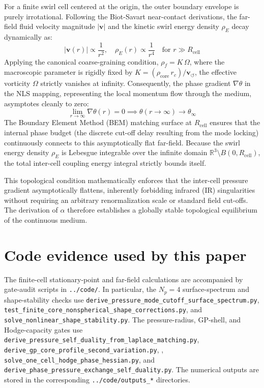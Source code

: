 \documentclass[11pt]{article}
\begin{document}
        For a finite swirl cell centered at the origin, the outer boundary envelope is purely irrotational. Following the Biot-Savart near-contact derivations, the far-field fluid velocity magnitude $|\mathbf{v}|$ and the kinetic swirl energy density $\rho_{\!E}$ decay dynamically as:
        \begin{equation}
            |\mathbf{v}(r)| \propto \frac{1}{r^2}, \quad \rho_{\!E}(r) \propto \frac{1}{r^4} \quad \text{for } r \gg R_{\text{cell}}
        \end{equation}
        Applying the canonical coarse-graining condition, $\rho_{\!f} = K\,\Omega$, where the macroscopic parameter is rigidly fixed by $K = (\rho_{\text{core}}\,r_c)/\mathbf{v}_{\!\boldsymbol{\circlearrowleft}}$, the effective vorticity $\Omega$ strictly vanishes at infinity. Consequently, the phase gradient $\nabla \theta$ in the NLS mapping, representing the local momentum flow through the medium, asymptotes cleanly to zero:
        \begin{equation}
            \lim_{r \to \infty} \nabla \theta(r) = 0 \implies \theta(r \to \infty) \to \theta_{\infty}
        \end{equation}
        The Boundary Element Method (BEM) matching surface at $R_{\text{cell}}$ ensures that the internal phase budget (the discrete cut-off delay resulting from the mode locking) continuously connects to this asymptotically flat far-field. Because the swirl energy density $\rho_{\!E}$ is Lebesgue integrable over the infinite domain $\mathbb{R}^3 \setminus B(0, R_{\text{cell}})$, the total inter-cell coupling energy integral strictly bounds itself.
        
        This topological condition mathematically enforces that the inter-cell pressure gradient asymptotically flattens, inherently forbidding infrared (IR) singularities without requiring an arbitrary renormalization scale or standard field cut-offs. The derivation of $\alpha$ therefore establishes a globally stable topological equilibrium of the continuous medium.

\section{Code evidence used by this paper}
\label{sec:paper3-code-evidence}

The finite-cell stationary-point and far-field calculations are accompanied by
gate-audit scripts in \texttt{../code/}.  In particular, the \(N_p=4\)
surface-spectrum and shape-stability checks use
\texttt{derive\_pressure\_mode\_cutoff\_surface\_spectrum.py},
\texttt{test\_finite\_core\_nonspherical\_shape\_corrections.py}, and
\texttt{solve\_nonlinear\_shape\_stability.py}.  The pressure-radius,
GP-shell, and Hodge-capacity gates use
\texttt{derive\_pressure\_self\_duality\_from\_laplace\_matching.py},
\texttt{derive\_gp\_core\_profile\_second\_variation.py}, ,
\texttt{solve\_one\_cell\_hodge\_phase\_hessian.py}, and
\texttt{derive\_phase\_pressure\_exchange\_self\_duality.py}.  The numerical
outputs are stored in the corresponding \texttt{../code/outputs\_*}
directories.
\end{document}
